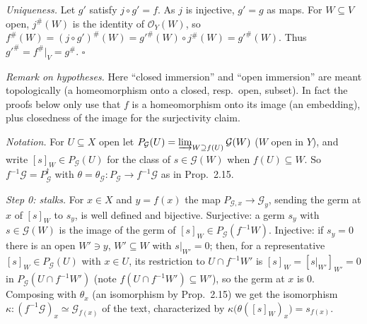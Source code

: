 \documentclass[11pt]{article}
\begin{document}
\emph{Uniqueness.} Let $g'$ satisfy $j\circ g'=f$. As $j$ is injective, $g'=g$ as maps. For $W\subseteq V$ open, $j^\#(W)$ is the identity of $\mathcal{O}_Y(W)$, so $f^\#(W)=(j\circ g')^\#(W)=g'^\#(W)\circ j^\#(W)=g'^\#(W)$. Thus $g'^\#=f^\#|_V=g^\#$. \hfill$\square$

\pf
\emph{Remark on hypotheses.} Here ``closed immersion'' and ``open immersion'' are meant topologically (a homeomorphism onto a closed, resp.\ open, subset). In fact the proofs below only use that $f$ is a homeomorphism onto its image (an embedding), plus closedness of the image for the surjectivity claim.

\emph{Notation.} For $U\subseteq X$ open let $P_{\mathcal{G}}(U)=\varinjlim_{W\supseteq f(U)}\mathcal{G}(W)$ ($W$ open in $Y$), and write $[s]_W\in P_{\mathcal{G}}(U)$ for the class of $s\in\mathcal{G}(W)$ when $f(U)\subseteq W$. So $f^{-1}\mathcal{G}=P_{\mathcal{G}}^\dagger$ with $\theta=\theta_{\mathcal{G}}:P_{\mathcal{G}}\to f^{-1}\mathcal{G}$ as in Prop.~2.15.

\emph{Step 0: stalks.} For $x\in X$ and $y=f(x)$ the map $P_{\mathcal{G},x}\to\mathcal{G}_y$, sending the germ at $x$ of $[s]_W$ to $s_y$, is well defined and bijective. Surjective: a germ $s_y$ with $s\in\mathcal{G}(W)$ is the image of the germ of $[s]_W\in P_{\mathcal{G}}(f^{-1}W)$. Injective: if $s_y=0$ there is an open $W'\ni y$, $W'\subseteq W$ with $s|_{W'}=0$; then, for a representative $[s]_W\in P_{\mathcal{G}}(U)$ with $x\in U$, its restriction to $U\cap f^{-1}W'$ is $[s]_W=[s|_{W'}]_{W'}=0$ in $P_{\mathcal{G}}(U\cap f^{-1}W')$ (note $f(U\cap f^{-1}W')\subseteq W'$), so the germ at $x$ is $0$. Composing with $\theta_x$ (an isomorphism by Prop.~2.15) we get the isomorphism $\kappa:(f^{-1}\mathcal{G})_x\simeq\mathcal{G}_{f(x)}$ of the text, characterized by $\kappa\bigl(\theta([s]_W)_x\bigr)=s_{f(x)}$.
\end{document}
